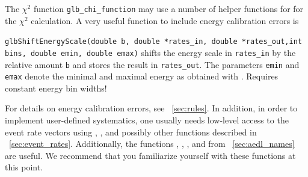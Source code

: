 The $\chi^2$ function {\tt glb\_chi\_function} may use a number of helper functions for
for the $\chi^2$ calculation. 
A very useful function to include energy calibration errors is
\begin{function}
{\tt glbShiftEnergyScale(double b, double *rates\_in, double *rates\_out,int bins, double emin, double emax)}
shifts the energy scale in {\tt rates\_in} by the relative amount {\tt b} and stores the result in 
{\tt rates\_out}. The parameters {\tt emin} and {\tt emax} denote the minimal and maximal energy
as obtained with . Requires constant energy bin widths!
\end{function}
For details on energy calibration errors, see \Sec~\ref{sec:rules}.
%
In addition, in order to implement user-defined systematics, one usually needs low-level access to the event rate vectors using , ,  and possibly other functions described in \Sec~\ref{sec:event_rates}. Additionally, the
functions , , , and  from \Sec~\ref{sec:aedl_names} are useful.  We recommend that you familiarize yourself with these functions at this point.

